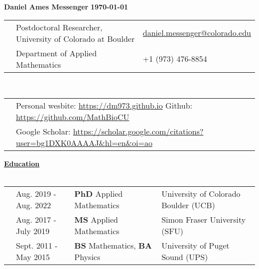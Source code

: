 \documentclass[letterpaper,11pt,oneside]{article}
\newcommand{\headr}[1]{\vspace{10pt}\uline{\Large{\textbf{#1}} \hfill } \\ \vspace{-10pt}\\}
\begin{document}
%
\noindent 
\LARGE{\textbf{Daniel Ames Messenger} \hspace{2in} \textbf{\monthyeardate\today}}   \\
\normalsize
%
%
\begin{center}
\begin{tabular}{@{} p{0.01cm} @{} p{10cm} @{} p{6.5cm}@{} }
& Postdoctoral Researcher, University of Colorado at Boulder & \hspace{0.5in} \href{mailto:daniel.messenger@colorado.edu}{daniel.messenger@colorado.edu} \\
& Department of Applied Mathematics    & \hspace{3.2cm}  +1 (973) 476-8854 \\
\end{tabular}\\ \vspace{0.5cm}
\begin{tabular}{@{} p{0.01cm} @{} p{16.5cm}@{} }
& Personal wesbite: \url{https://dm973.github.io} \hspace{1.5cm} Github: \url{https://github.com/MathBioCU} \\
& Google Scholar: \url{https://scholar.google.com/citations?user=bg1DXK0AAAAJ&hl=en&oi=ao} \\
\end{tabular}
\end{center}


\headr{Education}
 
\begin{tabular}{@{} p{0.01cm} @{} p{4.3cm} @{} p{5.7cm} @{} p{8cm}@{} }
& Aug. 2019 - Aug. 2022 & \textbf{PhD} Applied Mathematics & University of Colorado Boulder (UCB)\\ 
& Aug. 2017 - July 2019 & \textbf{MS} Applied Mathematics & Simon Fraser University (SFU)\\ 
& Sept. 2011 - May 2015  & \textbf{BS} Mathematics, \textbf{BA} Physics & University of Puget Sound (UPS)\\
\end{tabular}
\end{document}
